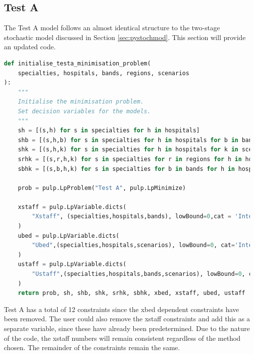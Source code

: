 \documentclass[../thesis.tex]{subfiles}
\begin{document}
\subsection{Test A}
The Test A model follows an almost identical structure to the two-stage stochastic model discussed in Section \ref{sec:pystochmod}. This section will provide an updated code.

\begin{lstlisting}[language=python]
def initialise_testa_minimisation_problem(
    specialties, hospitals, bands, regions, scenarios
):
    """
    Initialise the minimisation problem.
    Set decision variables for the models.
    """
    sh = [(s,h) for s in specialties for h in hospitals]
    shb = [(s,h,b) for s in specialties for h in hospitals for b in bands]
    shk = [(s,h,k) for s in specialties for h in hospitals for k in scenarios]
    srhk = [(s,r,h,k) for s in specialties for r in regions for h in hospitals for k in scenarios]
    sbhk = [(s,b,h,k) for s in specialties for b in bands for h in hospitals for k in scenarios]
    
    prob = pulp.LpProblem("Test A", pulp.LpMinimize)
    
    xstaff = pulp.LpVariable.dicts(
        "Xstaff", (specialties,hospitals,bands), lowBound=0,cat = 'Integer'
    )
    ubed = pulp.LpVariable.dicts(
        "Ubed",(specialties,hospitals,scenarios), lowBound=0, cat='Integer'
    )
    ustaff = pulp.LpVariable.dicts(
        "Ustaff",(specialties,hospitals,bands,scenarios), lowBound=0, cat='Integer'
    )
    return prob, sh, shb, shk, srhk, sbhk, xbed, xstaff, ubed, ustaff
\end{lstlisting}

Test A has a total of 12 constraints since the xbed dependent constraints have been removed. The user could also remove the xstaff constraints and add this as a separate variable, since these have already been predetermined. Due to the nature of the code, the xstaff numbers will remain consistent regardless of the method chosen. The remainder of the constraints remain the same.
\end{document}
